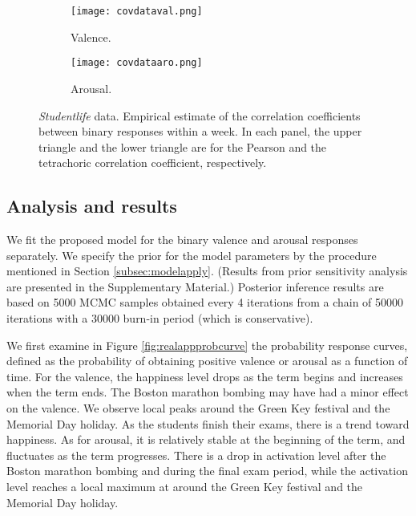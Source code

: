 \begin{figure}[t!]
    \centering
    \begin{subfigure}[b]{0.48\textwidth}
            \texttt{[image: covdataval.png]}
            \caption{{\footnotesize Valence.}}
    \end{subfigure}
    \begin{subfigure}[b]{0.48\textwidth}
            \texttt{[image: covdataaro.png]}
            \caption{{\footnotesize Arousal.}}
    \end{subfigure}
\caption{\textit{Studentlife} data. Empirical estimate of the correlation coefficients 
between binary responses within a week. In each panel, the upper triangle and the lower 
triangle are for the Pearson and the tetrachoric correlation coefficient, respectively. }
    \label{fig:datacorr}
\end{figure}



\subsection{Analysis and results}
\label{subsec:resultsrealapp}

We fit the proposed model for the binary valence and arousal responses separately. 
We specify the prior for the model parameters by the procedure mentioned in 
Section \ref{subsec:modelapply}. (Results from prior sensitivity analysis are 
presented in the Supplementary Material.) Posterior inference results are based on 
5000 MCMC samples obtained every 4 iterations from a chain of 50000 iterations with 
a 30000 burn-in period (which is conservative). 


We first examine in Figure \ref{fig:realappprobcurve} the probability response curves, 
defined as the probability of obtaining positive valence or arousal as a function of time.
For the valence, the happiness level drops as the term begins and increases when the term 
ends. The Boston marathon bombing may have had a minor effect on the valence. We observe 
local peaks around the Green Key festival and the Memorial Day holiday. As the students 
finish their exams, there is a trend toward happiness. As for arousal, it is relatively 
stable at the beginning of the term, and fluctuates as the term progresses. There is a 
drop in activation level after the Boston marathon bombing and during the final exam 
period, while the activation level reaches a local maximum at around the Green Key 
festival and the Memorial Day holiday. 
 
